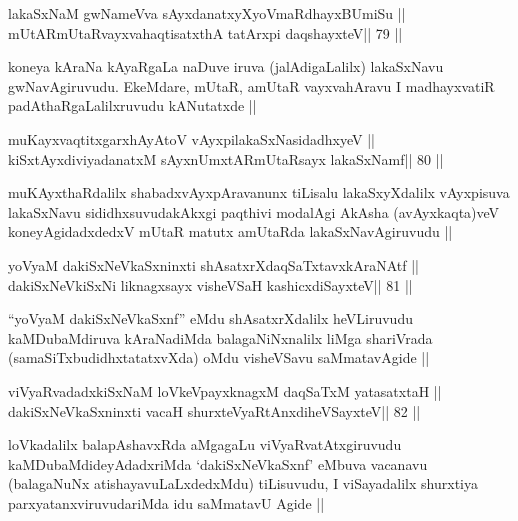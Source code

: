 \begin{shl}
lakaSxNaM gwNameVva sAyxdanatxyXyoV\footnotemark[3]maRdhayxBUmiSu ||
mUtARmUtaRvayxvahaqtisatxthA tatArxpi daqshayxteV\hfill || 79 ||
\end{shl}

\begin{artha}
koneya kAraNa kAyaRgaLa naDuve iruva (jalAdigaLalilx) lakaSxNavu
gwNavAgiruvudu. EkeMdare, mUtaR, amUtaR vayxvahAravu I
madhayxvatiR padAthaRgaLalilxruvudu kANutatxde ||
\end{artha}


\begin{shl}
muKayxvaqtitxgarxhAyAtoV vAyxpilakaSxNasidadhxyeV ||
kiSxtAyxdiviyadanatxM sAyxnUmxtARmUtaRsayx lakaSxNamf\hfill || 80 ||
\end{shl}

\begin{artha}
muKAyxthaRdalilx shabadxvAyxpAravanunx tiLisalu lakaSxyXdalilx
vAyxpisuva lakaSxNavu sididhxsuvudakAkxgi paqthivi modalAgi AkAsha
(avAyxkaqta)veV koneyAgidadxdedxV mUtaR matutx amUtaRda
lakaSxNavAgiruvudu ||
\end{artha}



\begin{shl}
yoV\s yaM dakiSxNeV\s kaSxninxti shAsatxrXdaqSaTxtavxkAraNAtf ||
dakiSxNeV\s kiSxNi liknagxsayx visheVSaH kashicxdiSayxteV\hfill || 81 ||
\end{shl}

\begin{artha}
``yoV\s yaM dakiSxNeV\s kaSxnf'' eMdu shAsatxrXdalilx heVLiruvudu
  kaMDubaMdiruva kAraNadiMda balagaNiNxnalilx liMga shariVrada
  (samaSiTxbudidhxtatatxvXda) oMdu visheVSavu saMmatavAgide ||
\end{artha}



\begin{shl}
viVyaRvadadxkiSxNaM loVkeV\s payxknagxM daqSaTxM yatasatxtaH ||
dakiSxNeV\s kaSxninxti vacaH shurxteVyaRtAnxdiheVSayxteV\hfill || 82 ||
\end{shl}

\begin{artha}
loVkadalilx balapAshavxRda aMgagaLu viVyaRvatAtxgiruvudu
kaMDubaMdideyAdadxriMda `dakiSxNeV\s kaSxnf' eMbuva vacanavu
(balagaNuNx atishayavuLaLxdedxMdu) tiLisuvudu, I viSayadalilx shurxtiya
parxyatanxviruvudariMda idu saMmatavU Agide ||
\end{artha}

